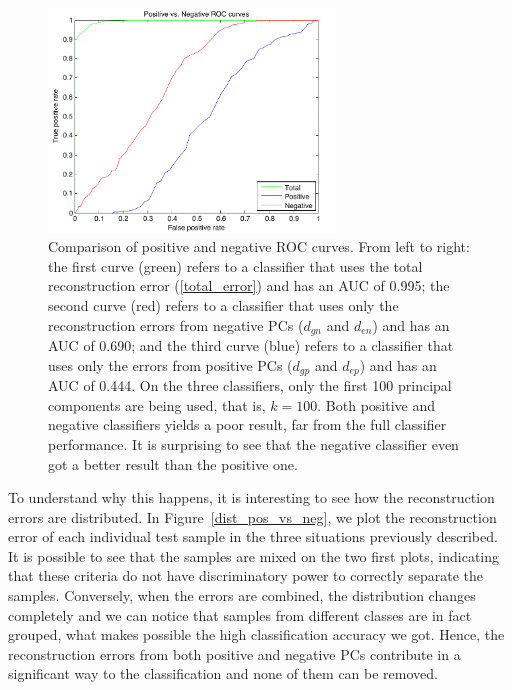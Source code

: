 \documentclass[10pt, conference, compsocconf]{IEEEtran}
\begin{document}
\begin{figure}[b!]
\centering
\includegraphics[width=3in]{roc_pos_vs_neg}
\caption{Comparison of positive and negative ROC curves. From left to right: the first curve (green) refers to a classifier that uses the total reconstruction error (\ref{total_error}) and has an AUC of 0.995; the second curve (red) refers to a classifier that uses only the reconstruction errors from negative PCs ($d_{gn}$ and $d_{en}$) and has an AUC of 0.690; and the third curve (blue) refers to a classifier that uses only the errors from positive PCs ($d_{gp}$ and $d_{ep}$) and has an AUC of 0.444. On the three classifiers, only the first 100 principal components are being used, that is, $k=100$. Both positive and negative classifiers yields a poor result, far from the full classifier performance. It is surprising to see that the negative classifier even got a better result than the positive one.}
\label{roc_pos_vs_neg}
\end{figure}

To understand why this happens, it is interesting to see how the reconstruction errors are distributed. In Figure~\ref{dist_pos_vs_neg}, we plot the reconstruction error of each individual test sample in the three situations previously described. It is possible to see that the samples are mixed on the two first plots, indicating that these criteria do not have discriminatory power to correctly separate the samples. Conversely, when the errors are combined, the distribution changes completely and we can notice that samples from different classes are in fact grouped, what makes possible the high classification accuracy we got. Hence, the reconstruction errors from both positive and negative PCs contribute in a significant way to the classification and none of them can be removed.
\end{document}
